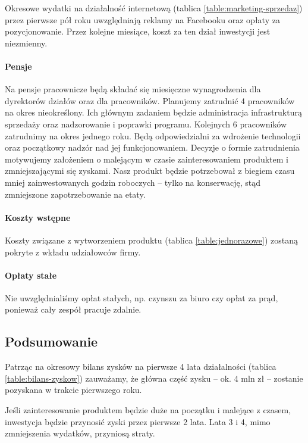 \documentclass[12pt]{article}
\begin{document}
Okresowe wydatki na działalność internetową (tablica \ref{table:marketing-sprzedaz}) przez pierwsze pół roku uwzględniają reklamy na Facebooku oraz opłaty za pozycjonowanie.
Przez kolejne miesiące, koszt za ten dział inwestycji jest niezmienny.

\paragraph{Pensje}

Na pensje pracownicze będą składać się miesięczne wynagrodzenia dla dyrektorów działów oraz dla pracowników.
Planujemy zatrudnić 4 pracowników na okres nieokreślony.
Ich głównym zadaniem będzie administracja infrastrukturą sprzedaży oraz nadzorowanie i poprawki programu.
Kolejnych 6 pracowników zatrudnimy na okres jednego roku.
Będą odpowiedzialni za wdrożenie technologii oraz początkowy nadzór nad jej funkcjonowaniem.
Decyzje o formie zatrudnienia motywujemy założeniem o malejącym w czasie zainteresowaniem produktem i zmniejszającymi się zyskami.
Nasz produkt będzie potrzebował z biegiem czasu mniej zainwestowanych godzin roboczych -- tylko na konserwację, stąd zmniejszone zapotrzebowanie na etaty.

\paragraph{Koszty wstępne}

Koszty związane z wytworzeniem produktu (tablica \ref{table:jednorazowe}) zostaną pokryte z wkładu udziałowców firmy.

\paragraph{Opłaty stałe}

Nie uwzględnialiśmy opłat stałych, np. czynszu za biuro czy opłat za prąd, ponieważ cały zespół pracuje zdalnie.

\subsection{Podsumowanie}

Patrząc na okresowy bilans zysków na pierwsze 4 lata działalności (tablica \ref{table:bilans-zyskow}) zauważamy, że główna część zysku -- ok. 4 mln zł -- zostanie pozyskana w trakcie pierwszego roku.

Jeśli zainteresowanie produktem będzie duże na początku i malejące z czasem, inwestycja będzie przynosić zyski przez pierwsze 2 lata.
Lata 3 i 4, mimo zmniejszenia wydatków, przyniosą straty.
\end{document}
